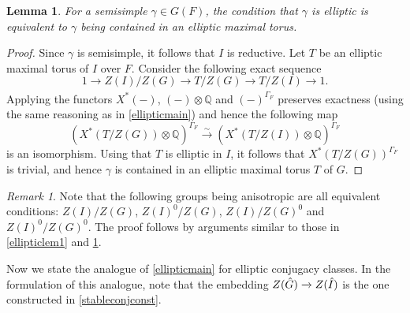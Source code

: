 \documentclass[11pt,a4paper]{article}
\theoremstyle{definition}
\theoremstyle{plain}
\newtheorem{Le}[shared]{Lemma}
\theoremstyle{remark}
\newtheorem{R}[shared]{Remark}
\theoremstyle{plain}
\begin{document}
\begin{Le}\label{ellipticlem2}
    For a semisimple $\gamma \in G(F)$, the condition that $\gamma$ is elliptic is equivalent to $\gamma$ being contained in an elliptic maximal torus.
\end{Le}
\begin{proof}
    Since $\gamma$ is semisimple, it follows that $I$ is reductive. Let $T$ be an elliptic maximal torus of $I$ over $F$. Consider the following exact sequence
    $$ 1 \xrightarrow[]{} Z(I)/Z(G) \xrightarrow[]{} T/Z(G) \xrightarrow[]{} T/Z(I) \xrightarrow[]{} 1.$$
    Applying the functors $X^*(-)$, $(-) \otimes \mathbb{Q}$ and $(-)^{\Gamma_F}$ preserves exactness (using the same reasoning as in \ref{ellipticmain}) and hence the following map
    $$ (X^*(T/Z(G)) \otimes \mathbb{Q})^{\Gamma_F} \xrightarrow[]{\sim} (X^*(T/Z(I))\otimes \mathbb{Q})^{\Gamma_F} $$
    is an isomorphism. Using that $T$ is elliptic in $I$, it follows that $X^*(T/Z(G))^{\Gamma_F}$ is trivial, and hence $\gamma$ is contained in an elliptic maximal torus $T$ of $G$.
\end{proof}

\begin{R}\label{ellipticremarkequiv}
    Note that the following groups being anisotropic are all equivalent conditions: $Z(I)/Z(G)$, $Z(I)^0/Z(G)$, $Z(I) / Z(G)^0$ and $Z(I)^0/Z(G)^0$.
    The proof follows by arguments similar to those in \ref{ellipticlem1} and \ref{ellipticlem2}.
\end{R}

Now we state the analogue of \ref{ellipticmain} for elliptic conjugacy classes. In the formulation of this analogue, note that the embedding $Z(\Hat{G}) \xrightarrow[]{} Z(\Hat{I})$ is the one constructed in \ref{stableconjconst}.
\end{document}

